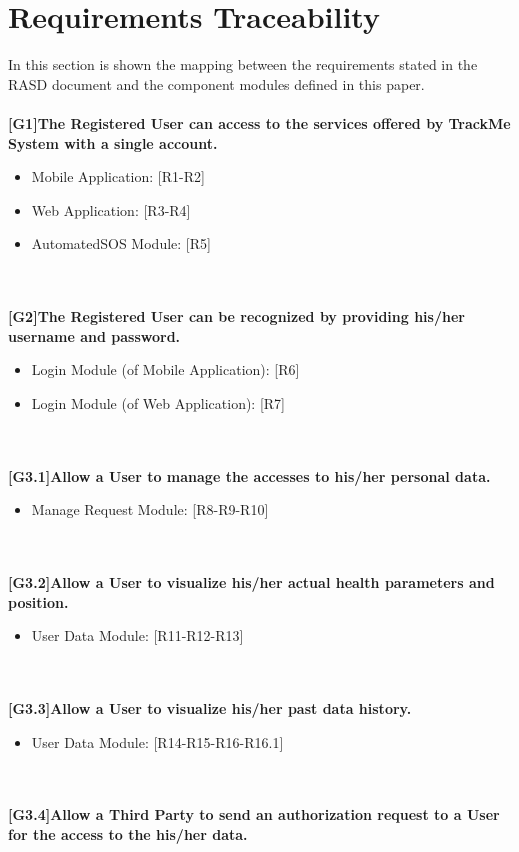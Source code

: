 \chapter{Requirements Traceability}
 In this section is shown the mapping between the requirements stated in the RASD document and the component modules defined in this paper.
\\ \\
 \textbf{[G1]The Registered User can access to the services offered by TrackMe System with a single account.}
 \begin{itemize}
 \item Mobile Application: [R1-R2]
 \item Web Application: [R3-R4]
\item AutomatedSOS Module: [R5]
 \end{itemize}\\ \\
 \textbf{[G2]The Registered User can be recognized by providing his/her username and password.}
  \begin{itemize}

     \item Login Module (of Mobile Application): [R6] 
     \item Login Module (of Web Application): [R7]
 \end{itemize} \\ \\
 \textbf{[G3.1]Allow a User to manage the accesses to his/her personal data.}
 \begin{itemize}
     \item Manage Request Module: [R8-R9-R10]
 \end{itemize} \\ \\
 \textbf{[G3.2]Allow a User to visualize his/her actual health parameters and position.}
\begin{itemize}
    \item User Data Module: [R11-R12-R13]
\end{itemize} \\ \\
 \textbf{[G3.3]Allow a User to visualize his/her past data history.}
\begin{itemize}
    \item User Data Module: [R14-R15-R16-R16.1]
\end{itemize} \\ \\
\textbf{[G3.4]Allow a Third Party to send an authorization request to a User for
the access to the his/her data.}
